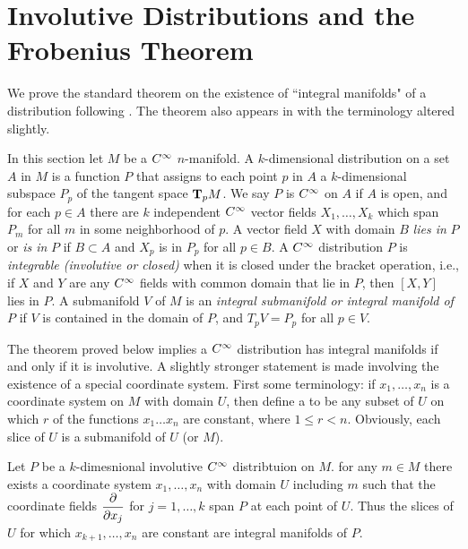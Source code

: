 \documentclass[../main]{subfiles}
\begin{document}
\section{Involutive Distributions and the Frobenius Theorem}\label{ch09:s1}
We prove the standard theorem on the existence of ``integral manifolds" of a distribution following \cite[p. 88]{chevalley1946theory}. The theorem also appears in \cite[p.~147]{auslander2012introduction} with the terminology altered slightly.

In this section let $M$ be a $\CInfty$ $n$-manifold. A $k$-dimensional distribution on a set $A$ in $M$ is a function $P$ that assigns to each point $p$ in $A$ a $k$-dimensional subspace $P_p$ of the tangent space $\tangentspace{M}{p}$. We say $P$ is $\CInfty$ on $A$ if $A$ is open, and for each $p \in A$ there are $k$ independent $\CInfty$ vector fields $X_1, \dots, X_k$ which span $P_m$ for all $m$ in some neighborhood of $p$. A vector field $X$ with domain $B$ \emph{lies in} $P$ or \emph{is in} $P$ if $B \subset A$ and $X_p$ is in $P_p$ for all $p \in B$. A $\CInfty$ distribution $P$ is \emph{integrable (involutive or closed)} when it is closed under the bracket operation, i.e., if $X$ and $Y$ are any $\CInfty$ fields with common domain that lie in $P$, then $[X,Y]$ lies in $P$. A submanifold $V$ of $M$ is an \emph{integral submanifold or integral manifold of $P$} if $V$ is contained in the domain of $P$, and $T_pV=P_p$ for all $p\in V$.

The theorem proved below implies a $\CInfty$ distribution has integral manifolds if and only if it is involutive. A slightly stronger statement is made involving the existence of a special coordinate system. First some terminology: if $x_1,\dots, x_n$ is a coordinate system on $M$ with domain $U$, then define a  to be any subset of $U$ on which $r$ of the functions $x_1\dots x_n$ are constant, where $1\leq r<n$. Obviously, each slice of $U$ is a submanifold of $U$ (or $M$).

\begin{theorem}\label{thm:ch09.1.1}
Let $P$ be a $k$-dimesnional involutive $\CInfty$ distribtuion on $M$. for any $m\in M$ there exists a coordinate system $x_1,\dots ,x_n$ with domain $U$ including $m$ such that the coordinate fields $\pdv{}{x_j}$ for $j=1,\dots, k$ span $P$ at each point of $U$. Thus the slices of $U$ for which $x_{k+1},\dots,x_n$ are constant are integral manifolds of $P$.
\end{theorem}
\end{document}
